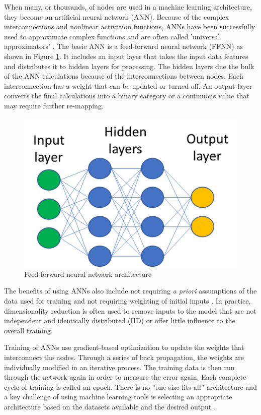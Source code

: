 \documentclass[twoside,twocolumn]{article}
\begin{document}
	When many, or thousands, of nodes are used in a machine learning architecture, they become an artificial neural network (ANN). Because of the complex interconnections and nonlinear activation functions, ANNs have been successfully used to approximate complex functions and are often called 'universal approximators' \citep{Sifaoui2008, Sonoda2017}. The basic ANN is a feed-forward neural network (FFNN) as shown in Figure \ref{fig:ffnn}. It includes an input layer that takes the input data features and distributes it to hidden layers for processing. The hidden layers due the bulk of the ANN calculations because of the interconnections between nodes. Each interconnection has a weight that can be updated or turned off. An output layer converts the final calculations into a binary category or a continuous value that may require further re-mapping.
	
	\begin{figure}[!ht]
		\centering
		\includegraphics[width=.6\columnwidth]{images/ffnn.png}  %
		\caption{Feed-forward neural network architecture}
		\label{fig:ffnn}
	\end{figure}
	
	The benefits of using ANNs also include not requiring \textit{a priori} assumptions of the data used for training and not requiring weighting of initial inputs \citep{Gardner1998}. In practice, dimensionality reduction is often used to remove inputs to the model that are not independent and identically distributed (IID) or offer little influence to the overall training. 
	
	Training of ANNs use gradient-based optimization to update the weights that interconnect the nodes. Through a series of back propagation, the weights are individually modified in an iterative process. The training data is then run through the network again in order to measure the error again. Each complete cycle of training is called an epoch. There is no ''one-size-fits-all'' architecture and a key challenge of using machine learning tools is selecting an appropriate architecture based on the datasets available and the desired output \citep{Wolpert1997}.
	
\end{document}
